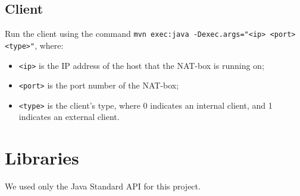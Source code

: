 \documentclass[10pt, a4paper]{article}
\begin{document}
\subsection{Client}
\label{ssec:execcli}

Run the client using the command \texttt{mvn exec:java -Dexec.args="<ip> <port>
<type>"}, where:
\begin{itemize}
  \item \texttt{<ip>} is the IP address of the host that the NAT-box is running
    on;
  \item \texttt{<port>} is the port number of the NAT-box;
  \item \texttt{<type>} is the client's type, where 0 indicates an internal
    client, and 1 indicates an external client.
\end{itemize}



\section{Libraries}
\label{sec:libs}

We used only the Java Standard API for this project.
\end{document}
